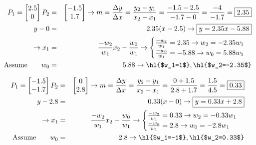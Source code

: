 \begin{enumerate}
\begin{qsolve}
		\begin{eqnarray*}
			P_1=\begin{bmatrix}
				2.5\\
				0
			\end{bmatrix}
			P_2&=&\begin{bmatrix}
				-1.5\\
				1.7
			\end{bmatrix}
			\rightarrow m=\frac{\Delta y}{\Delta x}=\frac{y_2-y_1}{x_2-x_1}=\frac{-1.5-2.5}{-1.7-0}=\frac{-4}{-1.7}=\boxed{2.35}\\
			y-0&=&2.35(x-2.5)\rightarrow \boxed{y=2.35x-5.88}\\
			\rightarrow x_1&=&\frac{-w_2}{w_1}x_2-\frac{w_0}{w_1} \rightarrow \begin{cases}
				\frac{-w_2}{w_1}=2.35 \rightarrow w_2=-2.35w_1\\
				\frac{-w_0}{w_1}=-5.88 \rightarrow w_0=5.88w_1 
			\end{cases}\\
			\text{Assume}\qquad w_0&=&5.88 \rightarrow \text{\hl{$w_1=1$}}, \text{\hl{$w_2=-2.35$}}
		\end{eqnarray*}
	\end{qsolve}
	
	
	
	
	
	
	\begin{qsolve}
		\begin{eqnarray*}
			P_1=\begin{bmatrix}
				-1.5\\
				-1.7
			\end{bmatrix}
			P_2&=&\begin{bmatrix}
				0\\
				2.8
			\end{bmatrix}
			\rightarrow m=\frac{\Delta y}{\Delta x}=\frac{y_2-y_1}{x_2-x_1}=\frac{0+1.5}{2.8+1.7}=\frac{1.5}{4.5}=\boxed{0.33}\\
			y-2.8&=&0.33(x-0)\rightarrow \boxed{y=0.33x+2.8}\\
			\rightarrow x_1&=&\frac{-w_2}{w_1}x_2-\frac{w_0}{w_1} \rightarrow \begin{cases}
				\frac{-w_2}{w_1}=0.33 \rightarrow w_2=-0.33w_1\\
				\frac{-w_0}{w_1}=2.8 \rightarrow w_0=-2.8w_1 
			\end{cases}\\
			\text{Assume}\qquad w_0&=&2.8 \rightarrow \text{\hl{$w_1=-1$}}, \text{\hl{$w_2=0.33$}}
		\end{eqnarray*}
	\end{qsolve}
	

\end{enumerate}
